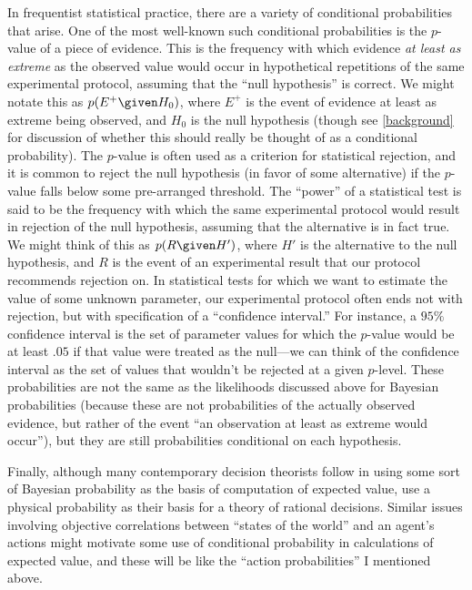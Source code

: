 In frequentist statistical practice, there are a variety of conditional probabilities that arise. One of the most well-known such conditional probabilities is the $p$-value of a piece of evidence. This is the frequency with which evidence \emph{at least as extreme} as the observed value would occur in hypothetical repetitions of the same experimental protocol, assuming that the ``null hypothesis'' is correct. We might notate this as $p(E^+ \given H_0)$, where $E^+$ is the event of evidence at least as extreme being observed, and $H_0$ is the null hypothesis (though see \autoref{background} for discussion of whether this should really be thought of as a conditional probability). The $p$-value is often used as a criterion for statistical rejection, and it is common to reject the null hypothesis (in favor of some alternative) if the $p$-value falls below some pre-arranged threshold. The ``power'' of a statistical test is said to be the frequency with which the same experimental protocol would result in rejection of the null hypothesis, assuming that the alternative is in fact true. We might think of this as $p(R \given H')$, where $H'$ is the alternative to the null hypothesis, and $R$ is the event of an experimental result that our protocol recommends rejection on. In statistical tests for which we want to estimate the value of some unknown parameter, our experimental protocol often ends not with rejection, but with specification of a ``confidence interval.'' For instance, a $95\%$ confidence interval is the set of parameter values for which the $p$-value would be at least $.05$ if that value were treated as the null---we can think of the confidence interval as the set of values that wouldn't be rejected at a given $p$-level. These probabilities are not the same as the likelihoods discussed above for Bayesian probabilities (because these are not probabilities of the actually observed evidence, but rather of the event ``an observation at least as extreme would occur''), but they are still probabilities conditional on each hypothesis.

Finally, although many contemporary decision theorists follow \citet{savage} in using some sort of Bayesian probability as the basis of computation of expected value, \citet{vnm} use a physical probability as their basis for a theory of rational decisions. Similar issues involving objective correlations between ``states of the world'' and an agent's actions might motivate some use of conditional probability in calculations of expected value, and these will be like the ``action probabilities'' I mentioned above.


